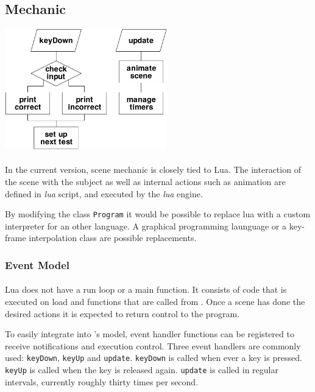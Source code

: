 \subsection{Mechanic\label{Mechanic}}

\begin{center}
\includegraphics[width=7cm]{media/code.pdf}
\end{center}

\paragraph{}
In the current version, scene mechanic is closely tied to Lua.
The interaction of the scene with the subject as well as internal actions such as animation are defined in \textit{lua} script, and executed by the \textit{lua} engine.

By modifying the class \lstinline{Program} it would be possible to replace lua with a custom interpreter for an other language.
A graphical programming launguage or a key-frame interpolation class are possible replacements.

\subsubsection{Event Model}
\paragraph{}
Lua does not have a run loop or a main function.
It consists of code that is executed on load and functions that are called from \ER.
Once a scene has done the desired actions it is expected to return control to the program.

To easily integrate into \ER's model, event handler functions can be registered to receive notifications and execution control.
Three event handlers are commonly used: \lstinline{keyDown}, \lstinline{keyUp} and \lstinline{update}.
\lstinline{keyDown} is called when ever a key is pressed.
\lstinline{keyUp} is called when the key is released again.
\lstinline{update} is called in regular intervals, currently roughly thirty times per second.

